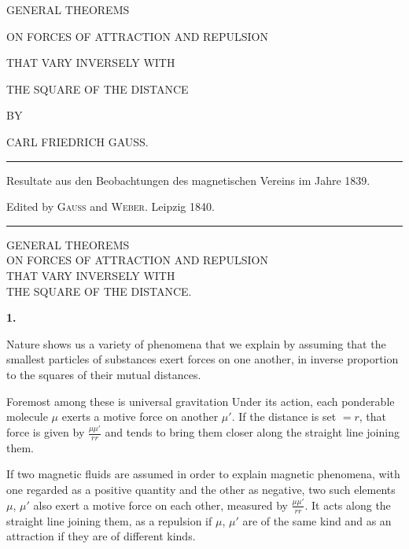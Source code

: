 \clearpage
\thispagestyle{empty}
\begin{center}
\vspace*{0.6in}
{\Large GENERAL THEOREMS\par}
\bigskip
ON FORCES OF ATTRACTION AND REPULSION\par
\bigskip
THAT VARY INVERSELY WITH\par
\bigskip
{\Large THE SQUARE OF THE DISTANCE\par}
\vspace{0.5in}
BY\par
\bigskip
{\large CARL FRIEDRICH GAUSS.\par}
\vfill
\rule{0.85\textwidth}{0.3pt}\par
Resultate aus den Beobachtungen des magnetischen Vereins im Jahre 1839.\par
Edited by \textsc{Gauss} and \textsc{Weber}. Leipzig 1840.\par
\rule{0.85\textwidth}{0.3pt}
\end{center}
\clearpage
{}
\renewcommand{\Article}[1]{\par\medskip\Needspace{4\baselineskip}\pdfbookmark[1]{Art. #1}{lehrsaetze-art-#1}\centerline{\textbf{#1.}}\nobreak\smallskip}
\begin{center}
GENERAL THEOREMS\\
ON FORCES OF ATTRACTION AND REPULSION\\
THAT VARY INVERSELY WITH\\
THE SQUARE OF THE DISTANCE.
\end{center}
\Article{1}
Nature shows us a variety of phenomena that we explain by assuming that the smallest particles of substances exert forces on one another, in inverse proportion to the squares of their mutual distances.

Foremost among these is universal gravitation Under its action, each ponderable molecule $\mu$ exerts a motive force on another $\mu'$. If the distance is set $=r$, that force is given by $\frac{\mu\mu'}{rr}$ and tends to bring them closer along the straight line joining them.

If two magnetic fluids are assumed in order to explain magnetic phenomena, with one regarded as a positive quantity and the other as negative, two such elements $\mu$, $\mu'$ also exert a motive force on each other, measured by $\frac{\mu\mu'}{rr}$. It acts along the straight line joining them, as a repulsion if $\mu$, $\mu'$ are of the same kind and as an attraction if they are of different kinds.

